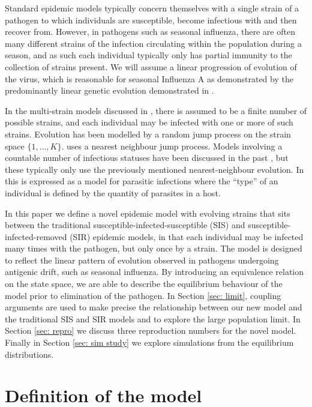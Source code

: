 \documentclass[smallextended]{svjour3}       %
\begin{document}
Standard epidemic models typically concern themselves with a single strain of a pathogen to which individuals are susceptible, become infectious with and then recover from. 
However, in pathogens such as seasonal influenza, there are often many different strains of the infection circulating within the population during a season, and as such each individual typically only has partial immunity to the collection of strains present. 
We will assume a linear progression of evolution of the virus, which is reasonable for seasonal Influenza A as demonstrated by the predominantly linear genetic evolution demonstrated in \cite{fitch1997}.

In the multi-strain models discussed in \cite{neal2006}, there is assumed to be a finite number of possible strains, and each individual may be infected with one or more of such strains. 
Evolution has been modelled by a random jump process on the strain space $\{1, \dots, K\}$. \cite{gog2002} uses a nearest neighbour jump process. Models involving a countable number of infectious statuses have been discussed in the past \cite{moy1967}, but these typically only use the previously mentioned nearest-neighbour evolution. In \cite{moy1967} this is expressed as a model for parasitic infections where the ``type'' of an individual is defined by the quantity of parasites in a host.

In this paper we define a novel epidemic model with evolving strains that sits between the traditional susceptible-infected-susceptible (SIS) and susceptible-infected-removed (SIR) epidemic models, in that each individual may be infected many times with the pathogen, but only once by a strain. The model is designed to reflect the linear pattern of evolution observed in pathogens undergoing antigenic drift, such as seasonal influenza. By introducing an equivalence relation on the state space, we are able to describe the equilibrium behaviour of the model prior to elimination of the pathogen. In Section \ref{sec: limit}, coupling arguments are used to make precise the relationship between our new model and the traditional SIS and SIR models and to explore the large population limit. In Section \ref{sec: repro} we discuss three reproduction numbers for the novel model. Finally in Section \ref{sec: sim study} we explore simulations from the equilibrium distributions.

\section{Definition of the model}\label{sec: models}
\end{document}
